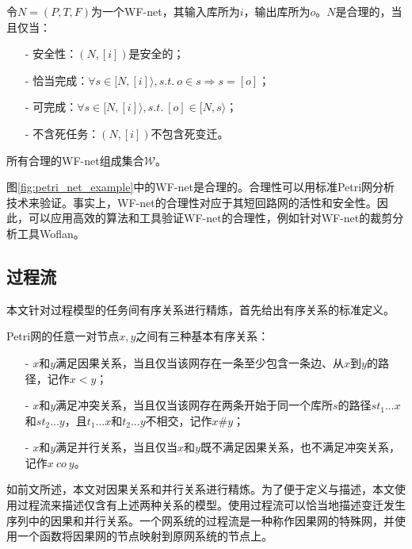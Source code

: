 \begin{definition}[合理性]\label{def:sound}
令$N=(P,T,F)$为一个WF-net，其输入库所为$i$，输出库所为$o$。$N$是合理的，当且仅当：
  \begin{itemize}
  	\item[-] 安全性：$(N,[i])$是安全的；
  	\item[-] 恰当完成：$\forall s\in[N,[i]\rangle,s.t.~o\in s\Rightarrow s=[o]$；
  	\item[-] 可完成：$\forall s\in[N,[i]\rangle,s.t.~[o]\in[N,s\rangle$；
  	\item[-] 不含死任务：$(N,[i])$不包含死变迁。
  \end{itemize}
所有合理的WF-net组成集合$\mathcal{W}$。
\end{definition}

图\ref{fig:petri_net_example}中的WF-net是合理的。合理性可以用标准Petri网分析技术来验证。事实上，WF-net的合理性对应于其短回路网的活性和安全性\cite{van1997verification,van1998application,van2004workflowbook}。因此，可以应用高效的算法和工具验证WF-net的合理性，例如针对WF-net的裁剪分析工具Woflan\cite{verbeek2001diagnosing}。

\subsection{过程流}\label{subsec:process_run}
本文针对过程模型的任务间有序关系进行精炼，首先给出有序关系的标准定义。

\begin{definition}\label{def:ordering_relations}
Petri网的任意一对节点$x,y$之间有三种基本有序关系：
  \begin{itemize}
  	\item[-] $x$和$y$满足因果关系，当且仅当该网存在一条至少包含一条边、从$x$到$y$的路径，记作$x<y$；
  	\item[-] $x$和$y$满足冲突关系，当且仅当该网存在两条开始于同一个库所$s$的路径$st_{1}...x$和$st_{2}...y$，且$t_{1}...x$和$t_{2}...y$不相交，记作$x\#y$；
  	\item[-] $x$和$y$满足并行关系，当且仅当$x$和$y$既不满足因果关系，也不满足冲突关系，记作$x~co~y$。
  \end{itemize}
\end{definition}

如前文所述，本文对因果关系和并行关系进行精炼。为了便于定义与描述，本文使用过程流来描述仅含有上述两种关系的模型。使用过程流可以恰当地描述变迁发生序列中的因果和并行关系。一个网系统的过程流是一种称作因果网的特殊网，并使用一个函数将因果网的节点映射到原网系统的节点上。

